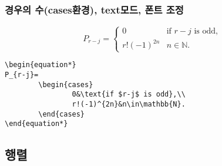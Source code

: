 \documentclass{beamer}
\begin{document}
\begin{frame}[fragile]

\frametitle{경우의 수(cases환경), text모드, 폰트 조정}

\begin{block}{}
\begin{equation*}
P_{r-j}=
	\begin{cases}
		0&\text{if $r-j$ is odd},\\
		r!(-1)^{2n}&n\in\mathbb{N}.
	\end{cases}
\end{equation*}
\end{block}

\begin{block}{}
\begin{center}
\begin{verbatim}
\begin{equation*}
P_{r-j}=
     	\begin{cases}
	          	0&\text{if $r-j$ is odd},\\
          		r!(-1)^{2n}&n\in\mathbb{N}.
     	\end{cases}
\end{equation*}
\end{verbatim}
\end{center}
\end{block}

\end{frame}


\subsection{행렬}
\end{document}
